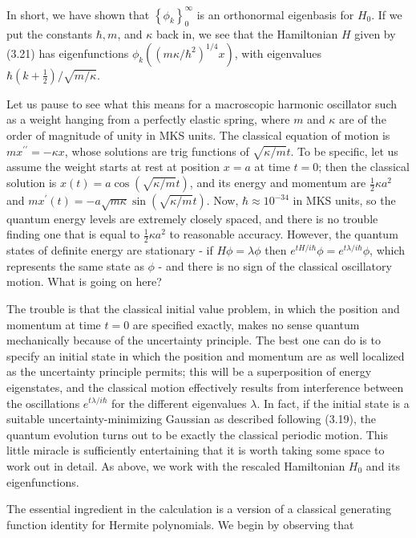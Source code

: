 \documentclass[10pt, letterpaper]{article}
\begin{document}
In short, we have shown that $\left\{\phi_{k}\right\}_{0}^{\infty}$ is an orthonormal eigenbasis for $H_{0}$. If we put the constants $\hbar, m$, and $\kappa$ back in, we see that the Hamiltonian $H$ given by (3.21) has eigenfunctions $\phi_{k}\left(\left(m \kappa / \hbar^{2}\right)^{1 / 4} x\right)$, with eigenvalues $\hbar\left(k+\frac{1}{2}\right) / \sqrt{m / \kappa}$.

Let us pause to see what this means for a macroscopic harmonic oscillator such as a weight hanging from a perfectly elastic spring, where $m$ and $\kappa$ are of the order of magnitude of unity in MKS units. The classical equation of motion is $m x^{\prime \prime}=-\kappa x$, whose solutions are trig functions of $\sqrt{\kappa / m} t$. To be specific, let us assume the weight starts at rest at position $x=a$ at time $t=0$; then the classical solution is $x(t)=a \cos (\sqrt{\kappa / m} t)$, and its energy and momentum are $\frac{1}{2} \kappa a^{2}$ and $m x^{\prime}(t)=-a \sqrt{m \kappa} \sin (\sqrt{\kappa / m} t)$. Now, $\hbar \approx 10^{-34}$ in MKS units, so the quantum energy levels are extremely closely spaced, and there is no trouble finding one that is equal to $\frac{1}{2} \kappa a^{2}$ to reasonable accuracy. However, the quantum states of definite energy are stationary - if $H \phi=\lambda \phi$ then $e^{t H / i \hbar} \phi=e^{t \lambda / i \hbar} \phi$, which represents the same state as $\phi$ - and there is no sign of the classical oscillatory motion. What is going on here?

The trouble is that the classical initial value problem, in which the position and momentum at time $t=0$ are specified exactly, makes no sense quantum mechanically because of the uncertainty principle. The best one can do is to specify an initial state in which the position and momentum are as well localized as the uncertainty principle permits; this will be a superposition of energy eigenstates, and the classical motion effectively results from interference between the oscillations $e^{t \lambda / i \hbar}$ for the different eigenvalues $\lambda$. In fact, if the initial state is a suitable uncertainty-minimizing Gaussian as described following (3.19), the quantum evolution turns out to be exactly the classical periodic motion. This little miracle is sufficiently entertaining that it is worth taking some space to work out in detail. As above, we work with the rescaled Hamiltonian $H_{0}$ and its eigenfunctions.

The essential ingredient in the calculation is a version of a classical generating function identity for Hermite polynomials. We begin by observing that
\end{document}
